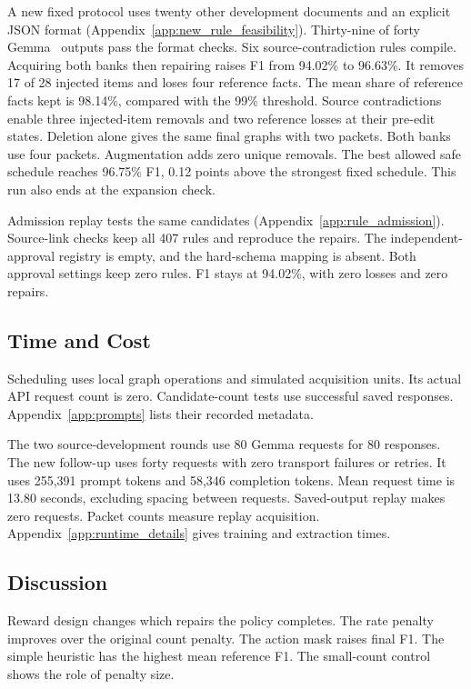 A new fixed protocol uses twenty other development documents and an
explicit JSON format (Appendix~\ref{app:new_rule_feasibility}).
Thirty-nine of forty Gemma~\cite{ref_gemma4} outputs pass the format checks.
Six source-contradiction rules compile. Acquiring both banks then repairing
raises F1 from 94.02\% to 96.63\%. It removes 17 of 28 injected items
and loses four reference facts. The mean share of reference facts kept is 98.14\%, compared
with the 99\% threshold. Source contradictions enable three injected-item
removals and two reference losses at their pre-edit states.
Deletion alone gives the same final graphs with two packets.
Both banks use four packets. Augmentation adds zero unique removals.
The best allowed safe schedule reaches 96.75\% F1, 0.12 points above
the strongest fixed schedule. This run also ends at the expansion check.

Admission replay tests the same candidates
(Appendix~\ref{app:rule_admission}). Source-link checks keep all 407 rules
and reproduce the repairs. The independent-approval registry is empty,
and the hard-schema mapping is absent. Both approval settings keep
zero rules. F1 stays at 94.02\%, with zero losses and zero repairs.

\subsection{Time and Cost}

\label{subsec:runtime_cost}

Scheduling uses local graph operations and simulated acquisition units.
Its actual API request count is zero. Candidate-count tests use successful
saved responses. Appendix~\ref{app:prompts} lists their recorded metadata.

The two source-development rounds use 80 Gemma requests for 80 responses.
The new follow-up uses forty requests with zero transport failures or
retries. It uses 255,391 prompt tokens and 58,346 completion tokens.
Mean request time is 13.80 seconds, excluding spacing between requests.
Saved-output replay makes zero requests. Packet counts measure replay
acquisition. Appendix~\ref{app:runtime_details} gives training and
extraction times.

\subsection{Discussion}

Reward design changes which repairs the policy completes. The rate
penalty improves over the original count penalty. The action mask raises
final F1. The simple heuristic has the highest mean reference F1.
The small-count control shows the role of penalty size.

